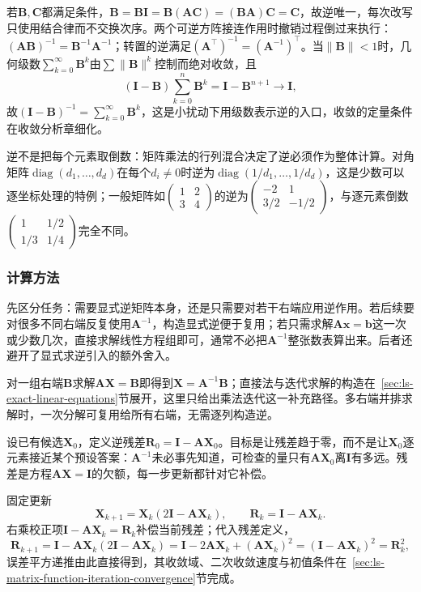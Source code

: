 若$\bm B,\bm C$都满足条件，$\bm B=\bm B\bm I=\bm B(\bm A\bm C)=(\bm B\bm A)\bm C=\bm C$，故逆唯一，每次改写只使用结合律而不交换次序。两个可逆方阵接连作用时撤销过程倒过来执行：$(\bm A\bm B)^{-1}=\bm B^{-1}\bm A^{-1}$；转置的逆满足$(\bm A^\top)^{-1}=(\bm A^{-1})^\top$。当$\lVert\bm B\rVert<1$时，几何级数$\sum_{k=0}^{\infty}\bm B^k$由$\sum\lVert\bm B\rVert^k$控制而绝对收敛，且
\[
 (\bm I-\bm B)\sum_{k=0}^{n}\bm B^k=\bm I-\bm B^{n+1}\to\bm I,
\]
故$(\bm I-\bm B)^{-1}=\sum_{k=0}^{\infty}\bm B^k$，这是小扰动下用级数表示逆的入口，收敛的定量条件在收敛分析章细化。

逆不是把每个元素取倒数：矩阵乘法的行列混合决定了逆必须作为整体计算。对角矩阵$\operatorname{diag}(d_1,\ldots,d_d)$在每个$d_i\neq0$时逆为$\operatorname{diag}(1/d_1,\ldots,1/d_d)$，这是少数可以逐坐标处理的特例；一般矩阵如$\begin{pmatrix}1&2\\3&4\end{pmatrix}$的逆为$\begin{pmatrix}-2&1\\3/2&-1/2\end{pmatrix}$，与逐元素倒数$\begin{pmatrix}1&1/2\\1/3&1/4\end{pmatrix}$完全不同。

\subsubsection{计算方法}

先区分任务：需要显式逆矩阵本身，还是只需要对若干右端应用逆作用。若后续要对很多不同右端反复使用$\bm A^{-1}$，构造显式逆便于复用；若只需求解$\bm A\bm x=\bm b$这一次或少数几次，直接求解线性方程组即可，通常不必把$\bm A^{-1}$整张数表算出来。后者还避开了显式求逆引入的额外舍入。

对一组右端$\bm B$求解$\bm A\bm X=\bm B$即得到$\bm X=\bm A^{-1}\bm B$；直接法与迭代求解的构造在~\ref{sec:ls-exact-linear-equations}节展开，这里只给出乘法迭代这一补充路径。多右端并排求解时，一次分解可复用给所有右端，无需逐列构造逆。

设已有候选$\bm X_0$，定义逆残差$\bm R_0=\bm I-\bm A\bm X_0$。目标是让残差趋于零，而不是让$\bm X_0$逐元素接近某个预设答案：$\bm A^{-1}$未必事先知道，可检查的量只有$\bm A\bm X_0$离$\bm I$有多远。残差是方程$\bm A\bm X=\bm I$的欠额，每一步更新都针对它补偿。

固定更新
\begin{equation}
 \bm X_{k+1}=\bm X_k(2\bm I-\bm A\bm X_k),
 \qquad \bm R_k=\bm I-\bm A\bm X_k.
 \label{eq:ls-newton-schulz-inverse}
\end{equation}
右乘校正项$\bm I-\bm A\bm X_k=\bm R_k$补偿当前残差；代入残差定义，
\[
 \bm R_{k+1}
 =\bm I-\bm A\bm X_k(2\bm I-\bm A\bm X_k)
 =\bm I-2\bm A\bm X_k+(\bm A\bm X_k)^2
 =(\bm I-\bm A\bm X_k)^2
 =\bm R_k^2,
\]
误差平方递推由此直接得到，其收敛域、二次收敛速度与初值条件在~\ref{sec:ls-matrix-function-iteration-convergence}节完成。

